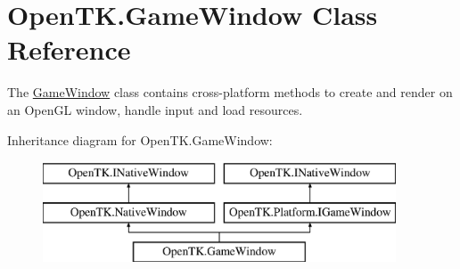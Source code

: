 \hypertarget{class_open_t_k_1_1_game_window}{\section{Open\-T\-K.\-Game\-Window Class Reference}
\label{class_open_t_k_1_1_game_window}
}


The \hyperlink{class_open_t_k_1_1_game_window}{Game\-Window} class contains cross-\/platform methods to create and render on an Open\-G\-L window, handle input and load resources.  


Inheritance diagram for Open\-T\-K.\-Game\-Window\-:\begin{figure}[H]
\begin{center}
\leavevmode
\includegraphics[height=3.000000cm]{class_open_t_k_1_1_game_window}
\end{center}
\end{figure}
